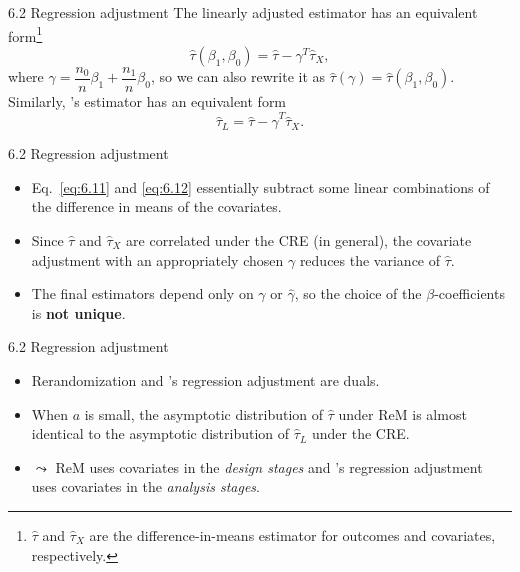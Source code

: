 \documentclass[aspectratio=169, 12pt]{beamer}
\begin{document}
\begin{frame}[label=lin-cov-imbalance]{6.2 Regression adjustment}
  The linearly adjusted estimator has an equivalent form\footnote{$\widehat{\tau}$ and $\widehat{\tau}_X$ are the difference-in-means estimator for outcomes and covariates, respectively.}
  \begin{equation}
    \widehat{\tau}(\beta_1,\beta_0)=\widehat{\tau}-\gamma^T\widehat{\tau}_X,
    \label{eq:6.11}
  \end{equation}
  where $\gamma=\dfrac{n_0}{n}\beta_1+\dfrac{n_1}{n}\beta_0$, so we can also rewrite it as $\widehat{\tau}(\gamma)=\widehat{\tau}(\beta_1,\beta_0)$. Similarly, \citet{lin2013agnostic}'s estimator has an equivalent form
  \begin{equation}
    \widehat{\tau}_L=\widehat{\tau}-\widehat{\gamma}^T\widehat{\tau}_X.
    \label{eq:6.12}
  \end{equation}
  \vfill
  \hfill\hyperlink{pr-lin-cov-imbalance<1>}{}
\end{frame}


\begin{frame}{6.2 Regression adjustment}
  \begin{itemize}
    \item Eq.~\eqref{eq:6.11} and \eqref{eq:6.12} essentially subtract some linear combinations of the difference in means of the covariates.
    \item Since $\widehat{\tau}$ and $\widehat{\tau}_X$ are correlated under the CRE (in general), the covariate adjustment with an appropriately chosen $\gamma$ reduces the variance of $\widehat{\tau}$.
    \item The final estimators depend only on $\gamma$ or $\widehat{\gamma}$, so the choice of the $\beta$-coefficients is \textbf{not unique}.
  \end{itemize}
\end{frame}

\begin{frame}{6.2 Regression adjustment}
  \begin{itemize}
    \item Rerandomization and \citet{lin2013agnostic}'s regression adjustment are duals.
    \item When $a$ is small, the asymptotic distribution of $\widehat{\tau}$ under ReM is almost identical to the asymptotic distribution of $\widehat{\tau}_L$ under the CRE.
    \item $\leadsto$ ReM uses covariates in the \textit{design stages} and \citet{lin2013agnostic}'s regression adjustment uses covariates in the \textit{analysis stages}. 
  \end{itemize}
\end{frame}
\end{document}
